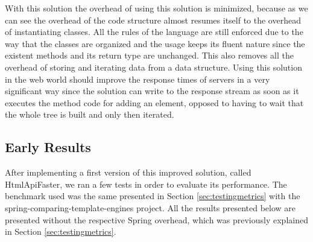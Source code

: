 \noindent
With this solution the overhead of using this solution is minimized, because as we can see the overhead of the code structure almost resumes itself to the overhead of instantiating classes. All the rules of the language are still enforced due to the way that the classes are organized and the usage keeps its fluent nature since the existent methods and its return type are unchanged. This also removes all the overhead of storing and iterating data from a data structure. Using this solution in the web world should improve the response times of servers in a very significant way since the solution can write to the response stream as soon as it executes the method code for adding an element, opposed to having to wait that the whole tree is built and only then iterated. 

\subsection{Early Results}

After implementing a first version of this improved solution, called HtmlApiFaster, we ran a few tests in order to evaluate its performance. The benchmark used was the same presented in Section \ref{sec:testingmetrics} with the spring-comparing-template-engines project. All the results presented below are presented without the respective Spring overhead, which was previously explained in Section \ref{sec:testingmetrics}.

